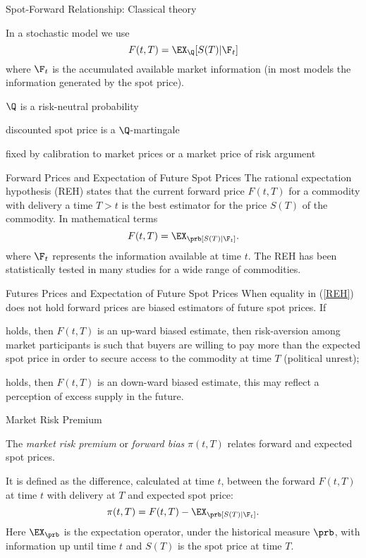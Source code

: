 {Spot-Forward Relationship: Classical theory}
\item<1-> In a stochastic model we use
$$
F(t,T)=\EX_{\Q}[S(T)|\F_t]
$$
where $\F_t$ is the accumulated available market information (in most models the information generated by the spot price).
\item<2-> $\Q$ is a risk-neutral probability
\item discounted spot price is a $\Q$-martingale
\item fixed by calibration to market prices or a market price of risk argument

{Forward Prices and Expectation of Future Spot Prices}
The rational expectation hypothesis (REH) states that the current forward price $F(t,T)$ for a commodity with
delivery a time $T>t$ is the best estimator for the price $S(T)$ of the commodity.
In mathematical terms
\begin{equation}\label{REH}
F(t,T) = \EX_\prb[S(T) |\F_t].
\end{equation}
where $\F_t$ represents the information available at time $t$. The REH has been statistically
tested in many studies for a wide range of commodities.

{Futures Prices and Expectation of Future Spot Prices}
When equality in (\ref{REH}) does not hold forward prices are biased estimators of
future spot prices. If
\item[$>$] holds, then $F(t,T)$ is an up-ward biased estimate, then risk-aversion
among market participants is such that buyers are willing to pay more than the expected
spot price in order to secure access to the commodity at time $T$ (political unrest);
\item[$<$] holds, then $F(t,T)$ is an down-ward biased estimate, this may reflect a
perception of excess supply in the future.

{Market Risk Premium}
\item<1-> The \emph{market risk premium} or \emph{forward bias} $\pi (t,T)$
relates forward and expected spot prices.
\item<2-> It is defined as the difference, calculated at time $t$, between
the forward $F(t,T)$ at time $t$ with delivery at $T$ and expected
spot price:
\begin{equation}\label{forward risk premium}
\pi(t,T)= F(t,T)-\EX_\prb[S(T)| \F_t].
\end{equation}
Here $\EX_\prb$ is the expectation operator, under the
historical measure $\prb$, with information up until time $t$ and
$S(T)$ is the spot price at time $T$.

